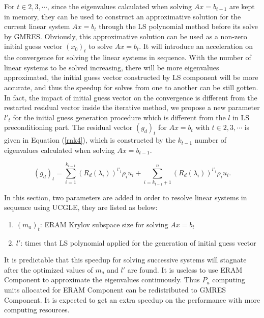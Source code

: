 For $t \in 2,3, \cdots$, since the eigenvalues calculated when solving $Ax = b_{t-1}$ are kept in memory, they can be used to construct an approximative solution for the current linear system $Ax=b_t$ through the LS polynomial method before its solve by GMRES. Obviously, this approximative solution can be used as a non-zero initial guess vector $(x_0)_t$ to solve $Ax=b_t$. It will introduce an acceleration on the convergence for solving the linear systems in sequence. With the number of linear systems to be solved increasing, there will be more eigenvalues approximated, the initial guess vector constructed by LS component will be more accurate, and thus the speedup for solves from one to another can be still gotten. In fact, the impact of initial guess vector on the convergence is different from the restarted residual vector inside the iterative method, we propose a new parameter $l'_t$ for the initial guess generation procedure which is different from the $l$ in LS preconditioning part. The residual vector $(g_d)_t$ for $Ax=b_t$ with $t \in 2,3, \cdots$ is given in Equation (\ref{rnk4}), which is constructed  by the $k_{t-1}$ number of eigenvalues calculated when solving $Ax=b_{t-1}$.

\begin{equation}
\label{rnk4}
(g_d)_t=\sum_{i=1}^{k_{t-1}}(R_d(\lambda_i))^{l'_t} \rho_i u_i + \sum_{i=k_{t-1}+1}^{n}(R_d(\lambda_i))^{l'_t} \rho_i u_i.
\end{equation}

In this section, two parameters are added in order to resolve linear systems in sequence using UCGLE, they are listed as below:

\begin{enumerate}
	\item $(m_a)_t$: ERAM Krylov subspace size for solving $Ax=b_t$
	\item $l'$: times that LS polynomial applied for the generation of initial guess vector
\end{enumerate}

It is predictable that this speedup for solving successive systems will stagnate after the optimized values of $m_a$ and $l'$ are found. It is useless to use ERAM Component to approximate the eigenvalues continuously. Thus $P_a$ computing units allocated for ERAM Component can be redistributed to GMRES Component. It is expected to get an extra speedup on the performance with more computing resources.

